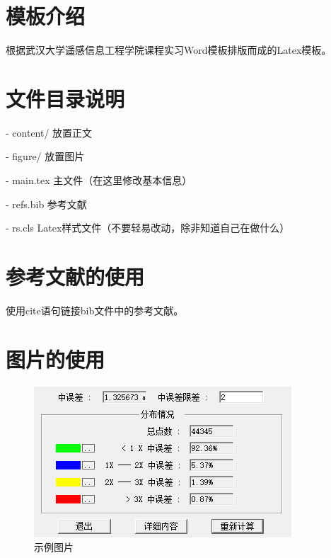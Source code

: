 \section{模板介绍}

根据武汉大学遥感信息工程学院课程实习Word模板排版而成的Latex模板。

\section{文件目录说明}

- content/ 放置正文

- figure/ 放置图片

- main.tex 主文件（在这里修改基本信息）

- refs.bib 参考文献

- rs.cls Latex样式文件（不要轻易改动，除非知道自己在做什么）

\section{参考文献的使用}

使用cite语句链接bib文件中的参考文献。\cite{CMJH200711001007}

\section{图片的使用}

\begin{figure}[H]%
    \centering
    \begin{minipage}{0.83\textwidth}%
        \centering
        \includegraphics[width=1.0%
        \textwidth]{figure/DEM拼接精度.png}%
        \caption{\fontsize{10pt}{15pt}\selectfont 示例图片}
    \end{minipage}
\end{figure}

